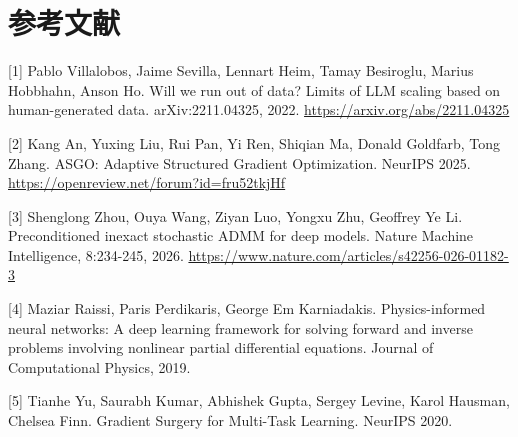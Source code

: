 \documentclass[UTF8,a4paper,12pt,fontset=none]{ctexart}
\begin{document}
\newpage
\section{参考文献}

[1] Pablo Villalobos, Jaime Sevilla, Lennart Heim, Tamay Besiroglu, Marius Hobbhahn, Anson Ho. Will we run out of data? Limits of LLM scaling based on human-generated data. arXiv:2211.04325, 2022. \url{https://arxiv.org/abs/2211.04325}

[2] Kang An, Yuxing Liu, Rui Pan, Yi Ren, Shiqian Ma, Donald Goldfarb, Tong Zhang. ASGO: Adaptive Structured Gradient Optimization. NeurIPS 2025. \url{https://openreview.net/forum?id=fru52tkjHf}

[3] Shenglong Zhou, Ouya Wang, Ziyan Luo, Yongxu Zhu, Geoffrey Ye Li. Preconditioned inexact stochastic ADMM for deep models. Nature Machine Intelligence, 8:234-245, 2026. \url{https://www.nature.com/articles/s42256-026-01182-3}

[4] Maziar Raissi, Paris Perdikaris, George Em Karniadakis. Physics-informed neural networks: A deep learning framework for solving forward and inverse problems involving nonlinear partial differential equations. Journal of Computational Physics, 2019.

[5] Tianhe Yu, Saurabh Kumar, Abhishek Gupta, Sergey Levine, Karol Hausman, Chelsea Finn. Gradient Surgery for Multi-Task Learning. NeurIPS 2020.
\end{document}
